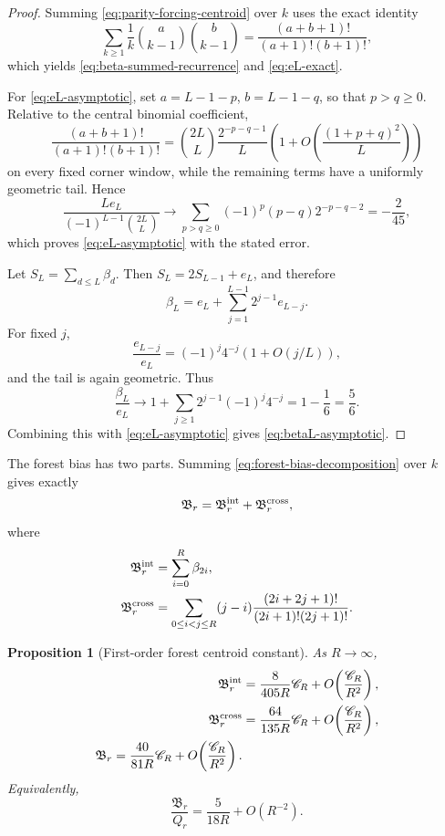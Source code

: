 \documentclass[11pt]{article}
\newtheorem{proposition}[theorem]{Proposition}
\theoremstyle{definition}
\theoremstyle{remark}
\begin{document}
\begin{proof}
Summing \eqref{eq:parity-forcing-centroid} over \(k\) uses the exact identity
\[
 \sum_{k\ge1}\frac1k
 \binom{a}{k-1}\binom{b}{k-1}
 =\frac{(a+b+1)!}{(a+1)!(b+1)!},
\]
which yields \eqref{eq:beta-summed-recurrence} and
\eqref{eq:eL-exact}.

For \eqref{eq:eL-asymptotic}, set
\(a=L-1-p\), \(b=L-1-q\), so that \(p>q\ge0\).  Relative to the central
binomial coefficient,
\[
 \frac{(a+b+1)!}{(a+1)!(b+1)!}
 =\binom{2L}{L}
 \frac{2^{-p-q-1}}{L}
 \left(1+O\!\left(\frac{(1+p+q)^2}{L}\right)\right)
\]
on every fixed corner window, while the remaining terms have a uniformly
geometric tail.  Hence
\[
 \frac{Le_L}{(-1)^{L-1}\binom{2L}{L}}
 \longrightarrow
 \sum_{p>q\ge0}(-1)^p(p-q)2^{-p-q-2}
 =-\frac{2}{45},
\]
which proves \eqref{eq:eL-asymptotic} with the stated error.

Let \(S_L=\sum_{d\le L}\beta_d\).  Then
\(S_L=2S_{L-1}+e_L\), and therefore
\[
 \beta_L
 =e_L+\sum_{j=1}^{L-1}2^{j-1}e_{L-j}.
\]
For fixed \(j\),
\[
 \frac{e_{L-j}}{e_L}
 =(-1)^j4^{-j}\left(1+O(j/L)\right),
\]
and the tail is again geometric.  Thus
\[
 \frac{\beta_L}{e_L}
 \longrightarrow
 1+\sum_{j\ge1}2^{j-1}(-1)^j4^{-j}
 =1-\frac16=\frac56.
\]
Combining this with \eqref{eq:eL-asymptotic} gives
\eqref{eq:betaL-asymptotic}.
\end{proof}

The forest bias has two parts.  Summing
\eqref{eq:forest-bias-decomposition} over \(k\) gives exactly
\begin{equation}
 \mathfrak B_r
 =\mathfrak B_r^{\rm int}+\mathfrak B_r^{\rm cross},
 \label{eq:B-split}
\end{equation}
where
\begin{align}
 \mathfrak B_r^{\rm int}
 &=\sum_{i=0}^{R}\beta_{2i},
 \label{eq:B-int-exact}\\
 \mathfrak B_r^{\rm cross}
 &=\sum_{0\le i<j\le R}(j-i)
 \frac{(2i+2j+1)!}{(2i+1)!(2j+1)!}.
 \label{eq:B-cross-exact}
\end{align}

\begin{proposition}[First-order forest centroid constant]
\label{prop:forest-centroid-first-order}
As \(R\to\infty\),
\begin{align}
 \mathfrak B_r^{\rm int}
 &=\frac{8}{405R}\mathscr C_R
 +O\!\left(\frac{\mathscr C_R}{R^2}\right),
 \label{eq:B-int-asymptotic}\\
 \mathfrak B_r^{\rm cross}
 &=\frac{64}{135R}\mathscr C_R
 +O\!\left(\frac{\mathscr C_R}{R^2}\right),
 \label{eq:B-cross-asymptotic}\\
 {
 \mathfrak B_r
 =\frac{40}{81R}\mathscr C_R
 +O\!\left(\frac{\mathscr C_R}{R^2}\right).}
 \label{eq:B-total-asymptotic}
\end{align}
Equivalently,
\begin{equation}
 \frac{\mathfrak B_r}{Q_r}
 =\frac{5}{18R}+O(R^{-2}).
 \label{eq:B-over-Q-asymptotic}
\end{equation}
\end{proposition}
\end{document}
